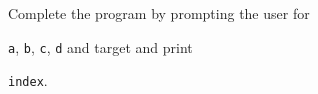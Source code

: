 Complete the program by prompting the user for

\texttt{a}, \texttt{b}, \texttt{c}, \texttt{d} and target and print

\texttt{index}.


